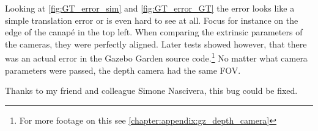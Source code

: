 \clearpage %

Looking at \cref{fig:GT_error_sim} and \cref{fig:GT_error_GT} the error looks like a simple translation error or is even hard to see at all. Focus for instance on the edge of the canapé in the top left. When comparing the extrinsic parameters of the cameras, they were perfectly aligned. 
Later tests showed however, that there was an actual error in the Gazebo Garden source code.\footnote[1]{For more footage on this see \cref{chapter:appendix:gz_depth_camera}} No matter what camera parameters were passed, the depth camera had the same FOV. 

Thanks to my friend and colleague Simone Nascivera, this bug could be fixed.
